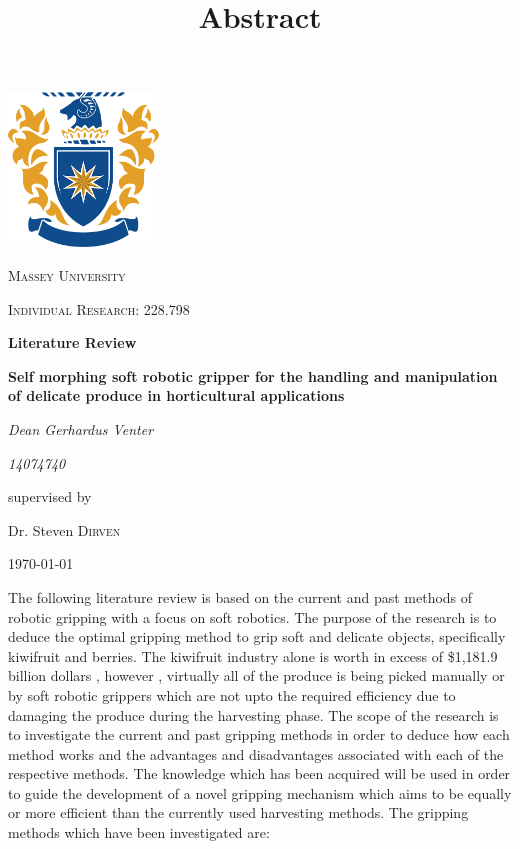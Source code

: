 \documentclass[11pt,twocolumn]{article}
\begin{document}
\begin{titlepage}
\centering
	\includegraphics[width=0.30\textwidth]{logo.png}\par\vspace{1cm}
	{\scshape\LARGE Massey University \par}
	\vspace{1cm}
	{\scshape\Large Individual Research: 228.798\par}
	\vspace{1.5cm}
	{\huge\bfseries Literature Review \par}
    \vspace{1cm}
    {\large\bfseries Self morphing soft robotic gripper for the handling and manipulation of delicate produce in horticultural applications\par}
	\vspace{2cm}
	{\large\itshape Dean Gerhardus Venter\par}
	\vspace{2cm}
	{\large\itshape 14074740\par}
	\vfill
	supervised by\par
	Dr. Steven  \textsc{Dirven}
   
	\vfill

	{\large \today \par}
\end{titlepage}
\title{Abstract}
\maketitle
\noindent
The following literature review is based on the current and past methods of robotic gripping with a focus on soft robotics. The purpose of the research is to deduce the optimal gripping method to grip soft and delicate objects, specifically kiwifruit and berries. The kiwifruit industry alone is worth in excess of \$1,181.9 billion dollars \cite{fresh_facts_2015}, however , virtually all of the produce is being picked manually or by soft robotic grippers which are not upto the required efficiency due to damaging the produce during the harvesting phase. The scope of the research is to investigate the current and past gripping methods in order to deduce how each method works and the advantages and disadvantages associated with each of the respective methods. The knowledge which has been acquired will be used in order to guide the development of a novel gripping mechanism which aims to be equally or more efficient than the currently used harvesting methods. The gripping methods which have been investigated are:
\end{document}

